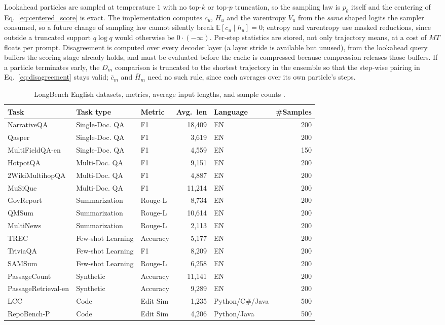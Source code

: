 \documentclass{article} %
\begin{document}
Lookahead particles are sampled at temperature $1$ with no top-$k$ or top-$p$ truncation, so the sampling law is $p_\theta$ itself and the centering of Eq.~\ref{eq:centered_score} is exact. The implementation computes $c_u$, $H_u$ and the varentropy $V_u$ from the \emph{same} shaped logits the sampler consumed, so a future change of sampling law cannot silently break $\mathbb{E}[c_u\mid h_u]=0$; entropy and varentropy use masked reductions, since outside a truncated support $q\log q$ would otherwise be $0\cdot(-\infty)$. Per-step statistics are stored, not only trajectory means, at a cost of $MT$ floats per prompt. Disagreement is computed over every decoder layer (a layer stride is available but unused), from the lookahead query buffers the scoring stage already holds, and must be evaluated before the cache is compressed because compression releases those buffers. If a particle terminates early, the $D_m$ comparison is truncated to the shortest trajectory in the ensemble so that the step-wise pairing in Eq.~\ref{eq:disagreement} stays valid; $\bar c_m$ and $\bar H_m$ need no such rule, since each averages over its own particle's steps.

\begin{table}[t]
\caption{LongBench English datasets, metrics, average input lengths, and sample counts \citep{bai2024longbench}.}
\label{tab:longbench_datasets}
\centering
\begin{tabular}{lllrlr}
\toprule
Task & Task type & Metric & Avg.\ len & Language & \#Samples \\
\midrule
NarrativeQA & Single-Doc. QA & F1 & 18{,}409 & EN & 200 \\
Qasper & Single-Doc. QA & F1 & 3{,}619 & EN & 200 \\
MultiFieldQA-en & Single-Doc. QA & F1 & 4{,}559 & EN & 150 \\
HotpotQA & Multi-Doc. QA & F1 & 9{,}151 & EN & 200 \\
2WikiMultihopQA & Multi-Doc. QA & F1 & 4{,}887 & EN & 200 \\
MuSiQue & Multi-Doc. QA & F1 & 11{,}214 & EN & 200 \\
GovReport & Summarization & Rouge-L & 8{,}734 & EN & 200 \\
QMSum & Summarization & Rouge-L & 10{,}614 & EN & 200 \\
MultiNews & Summarization & Rouge-L & 2{,}113 & EN & 200 \\
TREC & Few-shot Learning & Accuracy & 5{,}177 & EN & 200 \\
TriviaQA & Few-shot Learning & F1 & 8{,}209 & EN & 200 \\
SAMSum & Few-shot Learning & Rouge-L & 6{,}258 & EN & 200 \\
PassageCount & Synthetic & Accuracy & 11{,}141 & EN & 200 \\
PassageRetrieval-en & Synthetic & Accuracy & 9{,}289 & EN & 200 \\
LCC & Code & Edit Sim & 1{,}235 & Python/C\#/Java & 500 \\
RepoBench-P & Code & Edit Sim & 4{,}206 & Python/Java & 500 \\
\bottomrule
\end{tabular}
\end{table}
\end{document}
